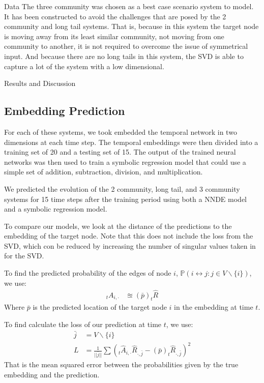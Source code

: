\documentclass[12pt]{amsart}
\begin{document}
\begin{section}{Data}
    The three community was chosen as a best case scenario system to model. It has been constructed to avoid the challenges that are posed by the 2 community and long tail systems. That is, because in this system the target node is moving away from its least similar community, not moving from one community to another, it is not required to overcome the issue of symmetrical input. And because there are no long tails in this system, the SVD is able to capture a lot of the system with a low dimensional.

\end{section}

\begin{section}{Results and Discussion}
    \subsection{Embedding Prediction}
        For each of these systems, we took embedded the temporal network in two dimensions at each time step. The temporal embeddings were then divided into a training set of 20 and a testing set of 15. The output of the trained neural networks was then used to train a symbolic regression model that could use a simple set of addition, subtraction, division, and multiplication. 

        We predicted the evolution of the 2 community, long tail, and 3 community systems for 15 time steps after the training period using both a NNDE model and a symbolic regression model.

        To compare our models, we look at the distance of the predictions to the embedding of the target node. Note that this does not include the loss from the SVD, which con be reduced by increasing the number of singular values taken in for the SVD.
        
        To find the predicted probability of the edges of node $i$, $\mathbb{P}(i \leftrightarrow j:j\in V\smallsetminus \{i\})$, we use: 
        \begin{align}
            _tA_{i,\cdot} &\approxeq (\bar p) _t\hat R
        \end{align}
        Where $\bar p$ is the predicted location of the target node $i$ in the embedding at time $t$.

        To find calculate the loss of our prediction at time $t$, we use:
        \begin{align}
            \bar j &= V \smallsetminus \{i\}  \\
            L &= \frac{1}{||\bar j||}\sum{(_t\hat A_{i,\cdot} \hat R_{\cdot,\bar j} - (\bar p) _t\hat R_{\cdot,\bar j})^2}
        \end{align}
        That is the mean squared error between the probabilities given by the true embedding and the prediction.
        

\end{section}
\end{document}
